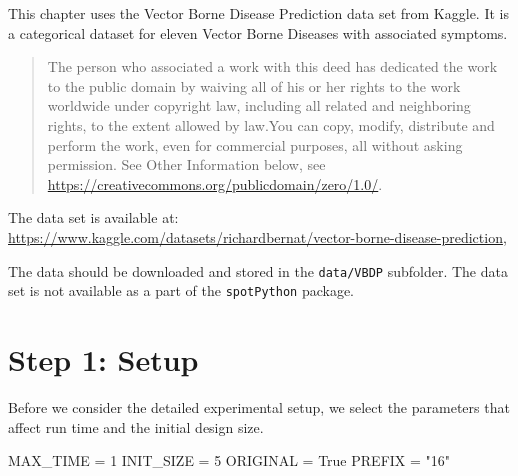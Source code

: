 \documentclass[
  letterpaper,
  DIV=11,
  numbers=noendperiod]{scrreprt}
\newenvironment{Shaded}{\begin{snugshade}}{\end{snugshade}}
\newcommand{\DecValTok}[1]{\textcolor[rgb]{0.68,0.00,0.00}{#1}}
\newcommand{\NormalTok}[1]{\textcolor[rgb]{0.00,0.23,0.31}{#1}}
\newcommand{\OperatorTok}[1]{\textcolor[rgb]{0.37,0.37,0.37}{#1}}
\newcommand{\StringTok}[1]{\textcolor[rgb]{0.13,0.47,0.30}{#1}}
\newcommand{\VariableTok}[1]{\textcolor[rgb]{0.07,0.07,0.07}{#1}}
\begin{document}
\begin{tcolorbox}[enhanced jigsaw, left=2mm, toprule=.15mm, colframe=quarto-callout-important-color-frame, leftrule=.75mm, title=\textcolor{quarto-callout-important-color}{\faExclamation}\hspace{0.5em}{Vector Borne Disease Prediction Data Set}, toptitle=1mm, opacitybacktitle=0.6, arc=.35mm, titlerule=0mm, opacityback=0, bottomtitle=1mm, coltitle=black, rightrule=.15mm, colback=white, colbacktitle=quarto-callout-important-color!10!white, breakable, bottomrule=.15mm]

This chapter uses the Vector Borne Disease Prediction data set from
Kaggle. It is a categorical dataset for eleven Vector Borne Diseases
with associated symptoms.

\begin{quote}
The person who associated a work with this deed has dedicated the work
to the public domain by waiving all of his or her rights to the work
worldwide under copyright law, including all related and neighboring
rights, to the extent allowed by law.You can copy, modify, distribute
and perform the work, even for commercial purposes, all without asking
permission. See Other Information below, see
\url{https://creativecommons.org/publicdomain/zero/1.0/}.
\end{quote}

The data set is available at:
\url{https://www.kaggle.com/datasets/richardbernat/vector-borne-disease-prediction},

The data should be downloaded and stored in the \texttt{data/VBDP}
subfolder. The data set is not available as a part of the
\texttt{spotPython} package.

\end{tcolorbox}

\hypertarget{sec-setup-16}{%
\section{Step 1: Setup}\label{sec-setup-16}}

Before we consider the detailed experimental setup, we select the
parameters that affect run time and the initial design size.

\begin{Shaded}
\begin{Highlighting}[]
\NormalTok{MAX\_TIME }\OperatorTok{=} \DecValTok{1}
\NormalTok{INIT\_SIZE }\OperatorTok{=} \DecValTok{5}
\NormalTok{ORIGINAL }\OperatorTok{=} \VariableTok{True}
\NormalTok{PREFIX }\OperatorTok{=} \StringTok{"16"}
\end{Highlighting}
\end{Shaded}
\end{document}
